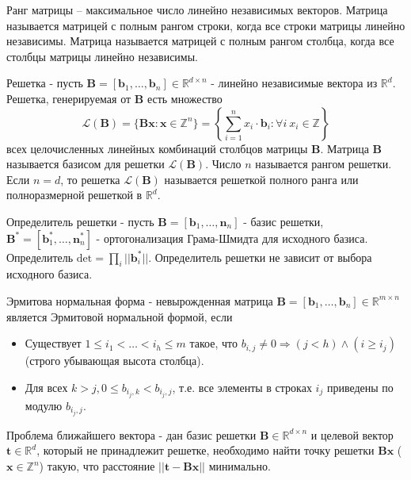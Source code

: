 Ранг матрицы – максимальное число линейно независимых векторов. Матрица называется матрицей с полным рангом строки, когда все строки матрицы линейно независимы. Матрица называется матрицей с полным рангом столбца, когда все столбцы матрицы линейно независимы.

Решетка - пусть $ \mathbf{B} = [\mathbf{b}_1, \ldots, \mathbf{b}_n] \in \mathbb{R}^{d \times n} $ - линейно независимые вектора из $ \mathbb{R}^d $. Решетка, генерируемая от $\mathbf{B}$ есть множество $$ \mathcal{L}(\mathbf{B}) = \lbrace \mathbf{Bx}: \mathbf{x} \in \mathbb{Z}^n \rbrace = \left\{ \sum\limits_{i=1}^n x_i \cdot \mathbf{b}_i: \forall i \ x_i \in \mathbb{Z} \right\} $$
всех целочисленных линейных комбинаций столбцов матрицы $\mathbf{B}$. Матрица $\mathbf{B}$ называется базисом для решетки $\mathcal{L}(\mathbf{B})$. Число $n$ называется рангом решетки. Если $n = d$, то решетка $\mathcal{L}(\mathbf{B})$ называется решеткой полного ранга или полноразмерной решеткой в $\mathbb{R}^d$. 

Определитель решетки - пусть $ \mathbf{B} = \left[\mathbf{b}_1, \ldots, \mathbf{n}_n \right] $ - базис решетки, $ \mathbf{B}^* = \left[\mathbf{b}^*_1, \ldots, \mathbf{n}^*_n \right] $ - ортогонализация Грама-Шмидта для исходного базиса. Определитель $\mathrm{det} = \prod_i ||\mathbf{b}^*_i||$. Определитель решетки не зависит от выбора исходного базиса.

Эрмитова нормальная форма - невырожденная матрица $ \mathbf{B}=\left[\mathbf{b}_1, \ldots, \mathbf{b}_n\right] \in \mathbb{R}^{m \times n}\ $ является Эрмитовой нормальной формой, если

\begin{itemize}
\item Существует $ 1 \le i_1 < \ldots < i_h \le m $ такое, что $ b_{i,j} \neq 0 \Rightarrow (j < h) \land (i \geq i_j) $ (строго убывающая высота столбца).
\item Для всех $ k>j, 0 \le b_{{i_j,k}}<b_{i_j,j} $, т.е. все элементы в строках $ i_j $ приведены по модулю $ b_{i_j, j} $.
\end{itemize}

Проблема ближайшего вектора - дан базис решетки $ \mathbf{B} \in \mathbb{R}^{d \times n} $ и целевой вектор $ \mathbf{t} \in \mathbb{R}^d $, который не принадлежит решетке, необходимо найти точку решетки $ \mathbf{Bx} $ ($ \mathbf{x} \in \mathbb{Z}^n $) такую, что расстояние $ ||\mathbf{t} - \mathbf{Bx}|| $ минимально. 


\clearpage